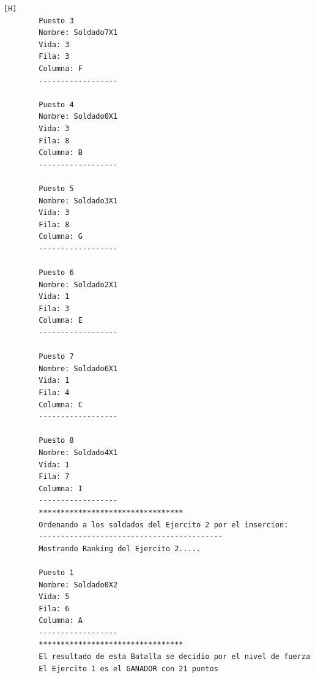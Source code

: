\documentclass{article}
\begin{document}
\begin{lstlisting}[language=bash,caption={Ejecucion:}][H]
		Puesto 3
		Nombre: Soldado7X1
		Vida: 3
		Fila: 3
		Columna: F
		------------------
		
		Puesto 4
		Nombre: Soldado0X1
		Vida: 3
		Fila: 8
		Columna: B
		------------------
		
		Puesto 5
		Nombre: Soldado3X1
		Vida: 3
		Fila: 8
		Columna: G
		------------------
		
		Puesto 6
		Nombre: Soldado2X1
		Vida: 1
		Fila: 3
		Columna: E
		------------------
		
		Puesto 7
		Nombre: Soldado6X1
		Vida: 1
		Fila: 4
		Columna: C
		------------------
		
		Puesto 8
		Nombre: Soldado4X1
		Vida: 1
		Fila: 7
		Columna: I
		------------------
		*********************************
		Ordenando a los soldados del Ejercito 2 por el insercion: 
		------------------------------------------
		Mostrando Ranking del Ejercito 2.....
		
		Puesto 1
		Nombre: Soldado0X2
		Vida: 5
		Fila: 6
		Columna: A
		------------------
		*********************************
		El resultado de esta Batalla se decidio por el nivel de fuerza de cada ejercito por lo que el resultado es: ...
		El Ejercito 1 es el GANADOR con 21 puntos
		
	\end{lstlisting}
\end{document}
